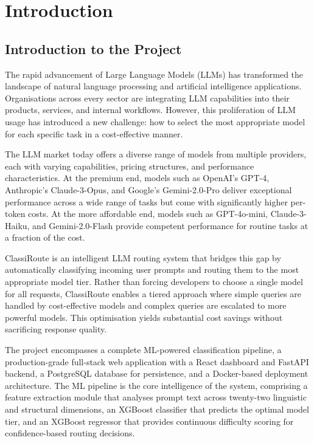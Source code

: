 \documentclass[oneside,12pt,a4paper]{report}
\begin{document}
\clearpage

\setcounter{page}{1}
\chapter{Introduction}

\section{Introduction to the Project}

The rapid advancement of Large Language Models (LLMs) has transformed the landscape of natural language processing and artificial intelligence applications. Organisations across every sector are integrating LLM capabilities into their products, services, and internal workflows. However, this proliferation of LLM usage has introduced a new challenge: how to select the most appropriate model for each specific task in a cost-effective manner.

The LLM market today offers a diverse range of models from multiple providers, each with varying capabilities, pricing structures, and performance characteristics. At the premium end, models such as OpenAI's GPT-4, Anthropic's Claude-3-Opus, and Google's Gemini-2.0-Pro deliver exceptional performance across a wide range of tasks but come with significantly higher per-token costs. At the more affordable end, models such as GPT-4o-mini, Claude-3-Haiku, and Gemini-2.0-Flash provide competent performance for routine tasks at a fraction of the cost.

ClassiRoute is an intelligent LLM routing system that bridges this gap by automatically classifying incoming user prompts and routing them to the most appropriate model tier. Rather than forcing developers to choose a single model for all requests, ClassiRoute enables a tiered approach where simple queries are handled by cost-effective models and complex queries are escalated to more powerful models. This optimisation yields substantial cost savings without sacrificing response quality.

The project encompasses a complete ML-powered classification pipeline, a production-grade full-stack web application with a React dashboard and FastAPI backend, a PostgreSQL database for persistence, and a Docker-based deployment architecture. The ML pipeline is the core intelligence of the system, comprising a feature extraction module that analyses prompt text across twenty-two linguistic and structural dimensions, an XGBoost classifier that predicts the optimal model tier, and an XGBoost regressor that provides continuous difficulty scoring for confidence-based routing decisions.
\end{document}
